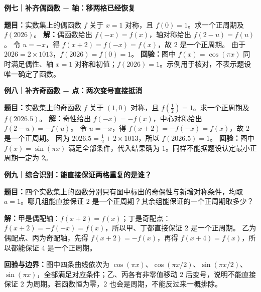 \clearpage
\begin{examplebox}
\textbf{例七｜补齐偶函数 + 轴：移两格已经恢复}


\textbf{题目：}实数集上的偶函数 $f$ 关于 $x=1$ 对称，且 $f(0)=1$。求一个正周期及 $f(2026)$。
\textbf{解：}偶函数给出 $f(-x)=f(x)$，轴对称给出 $f(2-u)=f(u)$。
令 $u=-x$，得 $f(x+2)=f(-x)=f(x)$，故 $2$ 是一个正周期。
由于 $2026=2\times1013$，$\boxed{f(2026)=f(0)=1}$。
\textbf{回验：}图中 $f(x)=\cos(\pi x)$ 同时满足偶性、轴 $x=1$ 对称和初值；$f(2026)=1$。示例用于核对，不表示题设唯一确定了函数。

\end{examplebox}
\clearpage
\begin{examplebox}
\textbf{例八｜补齐奇函数 + 点：两次变号直接抵消}


\textbf{题目：}实数集上的奇函数 $f$ 关于 $(1,0)$ 对称，且 $f(\tfrac12)=1$。求一个正周期及 $f(2026.5)$。
\textbf{解：}奇性给出 $f(-x)=-f(x)$，中心对称给出 $f(2-u)=-f(u)$。
令 $u=-x$，得 $f(x+2)=-f(-x)=f(x)$，故 $2$ 是一个正周期。
因为 $2026.5=\tfrac12+2\times1013$，所以 $\boxed{f(2026.5)=1}$。
\textbf{回验：}图中 $f(x)=\sin(\pi x)$ 满足全部条件，代入结果确为 $1$。同样不能据题设认定最小正周期一定为 $2$。

\end{examplebox}
\clearpage
\begin{examplebox}
\textbf{例九｜综合识别：能直接保证两格重复的是谁？}


\textbf{题目：}四个实数集上的函数分别只有图中标出的奇偶性与新增对称条件，均取 $a=1$。哪几组能直接保证 $2$ 是一个正周期？其余组能保证的一个正周期取多少？

\textbf{解：}甲是偶配轴：$f(x+2)=f(x)$；丁是奇配点：$f(x+2)=-f(-x)=f(x)$，所以甲、丁都直接保证 $2$ 是一个正周期。
乙为偶配点、丙为奇配轴，先得 $f(x+2)=-f(x)$，再得 $f(x+4)=f(x)$，所以都能保证 $4$ 是一个正周期。

\textbf{回验与边界：}图中四条曲线依次为 $\cos(\pi x)$、$\cos(\pi x/2)$、$\sin(\pi x/2)$、$\sin(\pi x)$，全部满足对应条件；乙、丙各有非零值移动 $2$ 后变号，说明不能直接保证 $2$ 为周期。若函数恒为零，$2$ 也会是周期，不能反过来一概排除。

\end{examplebox}
